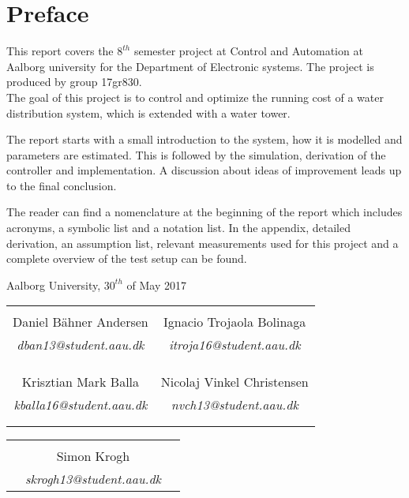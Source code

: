 \chapter*{Preface}

This report covers the $8^{th}$ semester project at Control and Automation at Aalborg university for the Department of Electronic systems. The project is produced by group 17gr830.\\
The goal of this project is to control and optimize the running cost of a water distribution system, which is extended with a water tower.  

The report starts with a small introduction to the system, how it is modelled and parameters are estimated. This is followed by the simulation, derivation of the controller and implementation. A discussion about ideas of improvement leads up to the final conclusion. 

The reader can find a nomenclature at the beginning of the report which includes acronyms, a symbolic list and a notation list. In the appendix, detailed derivation, an assumption list, relevant measurements used for this project and a complete overview of the test setup can be found.


\hfill Aalborg University, $30^{th}$ of May 2017




\vfill

\begin{table}[H]
	\centering
		\begin{tabular}{c c }
			\underline{\phantom{mmmmmmmmmmmmmmmmmmm}}       & \underline{\phantom{mmmmmmmmmmmmmmmmmmm}} \\
			Daniel Bähner Andersen			 & Ignacio Trojaola Bolinaga  \\
			\textit{dban13@student.aau.dk} & \textit{itroja16@student.aau.dk}\\
			&\\
			&\\
			\underline{\phantom{mmmmmmmmmmmmmmmmmmm}}       & \underline{\phantom{mmmmmmmmmmmmmmmmmmm}} \\
			Krisztian Mark Balla			 & Nicolaj Vinkel Christensen \\
			\textit{kballa16@student.aau.dk} & \textit{nvch13@student.aau.dk} \\
			&\\
			&\\	
		\end{tabular}
		\begin{tabular}{c c c}
			& \underline{\phantom{mmmmmmmmmmmmmmmmmmm}} 	& \\
			& Simon Krogh					& \\
			& \textit{skrogh13@student.aau.dk}		& \\
		\end{tabular}
\end{table}